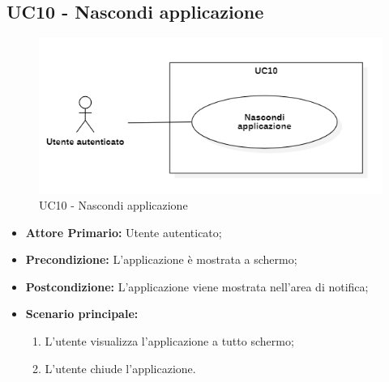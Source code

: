 \subsection{UC10 - Nascondi applicazione}
\begin{figure}[H]
    \centering
    \includegraphics[scale = 0.7]{components/img/UC10.png}
    \caption{UC10 - Nascondi applicazione}
\end{figure}
\begin{itemize}
\item \textbf{Attore Primario:} Utente autenticato;
\item \textbf{Precondizione:} L'applicazione è mostrata a schermo;
\item \textbf{Postcondizione:} L'applicazione viene mostrata nell'area di notifica;
\item \textbf{Scenario principale:}
    \begin{enumerate}
    \item L'utente visualizza l'applicazione a tutto schermo;
    \item L'utente chiude l'applicazione.
    \end{enumerate}
\end{itemize}